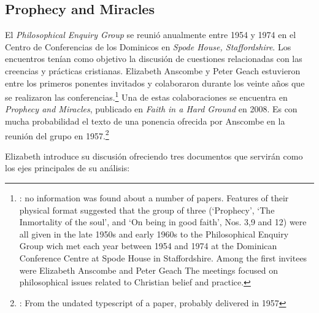 \subsection{Prophecy and Miracles}

El \emph{Philosophical Enquiry Group} se reunió anualmente entre 1954 y 1974 en
el Centro de Conferencias de los Dominicos en \emph{Spode House, Staffordshire}.
Los encuentros tenían como objetivo la discusión de cuestiones relacionadas con
las creencias y prácticas cristianas. Elizabeth Anscombe y Peter Geach
estuvieron entre los primeros ponentes invitados y colaboraron durante los
veinte años que se realizaron las
conferencias.\footnote{\cite[Cf.~][x]{anscombe2008faith}: \textelp{} no
  information was found about a number of papers. Features of their physical
  format suggested that the group of three (`Prophecy', `The Inmortality of the
  soul', and `On being in good faith', Nos. 3,9 and 12) were all given in the
  late 1950s and early 1960s to the Philosophical Enquiry Group wich met each
  year between 1954 and 1974 at the Dominican Conference Centre at Spode House
  in Staffordshire. \textelp{} Among the first invitees were Elizabeth Anscombe
  and Peter Geach \textelp{} The meetings focused on philosophical issues
  related to Christian belief and practice.} Una de estas colaboraciones se
encuentra en \emph{Prophecy and Miracles}, publicado en \emph{Faith in a Hard
  Ground} en 2008. Es con mucha probabilidad el texto de una ponencia ofrecida
por Anscombe en la reunión del grupo en 1957.\footnote{\cite[Cf.~][nota a pie de
  página 20]{anscombe2008faith:prophandmi}: From the undated typescript of a
  paper, probably delivered in 1957}

Elizabeth introduce su discusión ofreciendo tres documentos que servirán como los ejes principales de su análisis:

